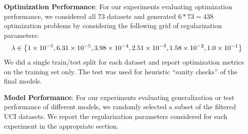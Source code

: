 \textbf{Optimization Performance}:
For our experiments evaluating optimization performance, we considered all 73 datasets and generated \( 6 * 73 = 438 \) optimization problems by considering the following grid of regularization parameters:
\[
    \lambda \in \left\{1 \times 10^{-5},
        6.31 \times 10^{-5},
        3.98 \times 10^{-4},
        2.51 \times 10^{-3},
        1.58 \times 10^{-2},
        1.0 \times 10^{-1}\right\}
\]
We did a single train/test split for each dataset and report optimization metrics on the training set only.
The test was used for heuristic ``sanity checks'' of the final models.

\textbf{Model Performance}:
For our experiments evaluating generalization or test performance of different models, we randomly selected a subset of the filtered UCI datasets.
We report the regularization parameters considered for each experiment in the appropriate section.

